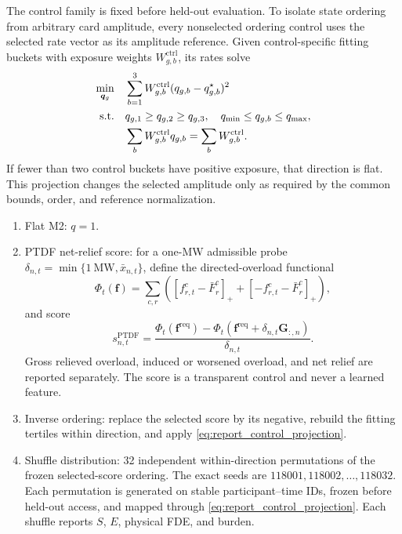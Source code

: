 \documentclass[10pt,journal,onecolumn]{IEEEtran}
\newcommand{\pos}[1]{\left[#1\right]_+}
\begin{document}
The control family is fixed before held-out evaluation. To isolate state
ordering from arbitrary card amplitude, every nonselected ordering control uses
the selected rate vector as its amplitude reference. Given control-specific
fitting buckets with exposure weights $W_{g,b}^{\mathrm{ctrl}}$, its rates solve
\begin{align}
\min_{\bm q_g}\quad
&\sum_{b=1}^3W_{g,b}^{\mathrm{ctrl}}
(q_{g,b}-q_{g,b}^{\star})^2
\label{eq:report_control_projection}\\
\mathrm{s.t.}\quad
&q_{g,1}\geq q_{g,2}\geq q_{g,3},\quad
q_{\min}\leq q_{g,b}\leq q_{\max},
\notag\\
&\sum_bW_{g,b}^{\mathrm{ctrl}}q_{g,b}
=\sum_bW_{g,b}^{\mathrm{ctrl}}.
\notag
\end{align}
If fewer than two control buckets have positive exposure, that direction is
flat. This projection changes the selected amplitude only as required by the
common bounds, order, and reference normalization.

\begin{enumerate}[leftmargin=*,itemsep=2pt]
\item Flat M2: $q=1$.
\item PTDF net-relief score: for a one-MW admissible probe
$\delta_{n,t}=\min\{1\ \mathrm{MW},\bar x_{n,t}\}$, define the directed-overload
functional
\begin{equation}
\Phi_t(\bm f)=\sum_{c,r}
\left(\pos{f_{r,t}^c-\bar F_r^c}
+\pos{-f_{r,t}^c-\bar F_r^c}\right),
\end{equation}
and score
\begin{equation}
s_{n,t}^{\mathrm{PTDF}}
=\frac{\Phi_t(\bm f^{\mathrm{req}})
-\Phi_t(\bm f^{\mathrm{req}}+\delta_{n,t}\bm G_{:,n})}
{\delta_{n,t}}.
\label{eq:report_ptdf_score}
\end{equation}
Gross relieved overload, induced or worsened overload, and net relief are
reported separately. The score is a transparent control and never a learned
feature.
\item Inverse ordering: replace the selected score by its negative, rebuild the
fitting tertiles within direction, and apply
\eqref{eq:report_control_projection}.
\item Shuffle distribution: 32 independent within-direction permutations of the
frozen selected-score ordering. The exact seeds are
$118001,118002,\ldots,118032$. Each permutation is generated on stable
participant--time IDs, frozen before held-out access, and mapped through
\eqref{eq:report_control_projection}. Each shuffle reports $S$, $E$, physical
FDE, and burden.
\end{enumerate}
\end{document}
